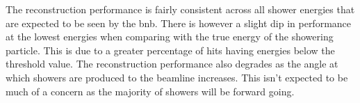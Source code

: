 The reconstruction performance is fairly consistent across all shower energies that are expected to be seen by the \gls{bnb}. There is however a slight dip in performance at the lowest energies when comparing with the true energy of the showering particle. This is due to a greater percentage of hits having energies below the threshold value. The reconstruction performance also degrades as the angle at which showers are produced to the beamline increases. This isn't expected to be much of a concern as the majority of showers will be forward going. 

